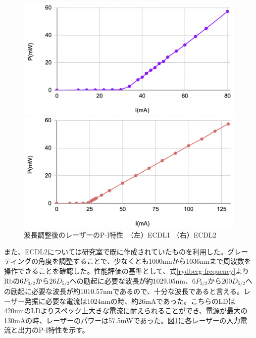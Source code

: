 \documentclass[dvipdfmx]{jsarticle}
\begin{document}
\begin{figure}[hbtp]
\centering
\begin{minipage}[b]{0.45\linewidth}
\includegraphics[width=1\textwidth]{images/420-P-I.png}
\end{minipage}
\begin{minipage}[b]{0.45\linewidth}
\includegraphics[width=1\textwidth]{images/1024-P-I.png}
\end{minipage}
\caption{\label{fig:p-i}波長調整後のレーザーのP-I特性　（左）ECDL1 （右）ECDL2}
\end{figure}
また、ECDL2については研究室で既に作成されていたものを利用した。グレーティングの角度を調整することで、少なくとも1000nmから1036nmまで周波数を操作できることを確認した。性能評価の基準として、式\ref{rydberg-frequency}よりRbの$6P_{3/2}$から$26D_{5/2}$への励起に必要な波長が約1029.05nm、$6P_{3/2}$から$200D_{5/2}$への励起に必要な波長が約1010.57nmであるので、十分な波長であると言える。レーザー発振に必要な電流は1024nmの時、約26mAであった。こちらのLDは420nmのLDよりスペック上大きな電流に耐えられることができ、電源が最大の130mAの時、レーザーのパワーは57.5mWであった。図\ref{fig:p-i}に各レーザーの入力電流と出力のP-I特性を示す。
\end{document}
